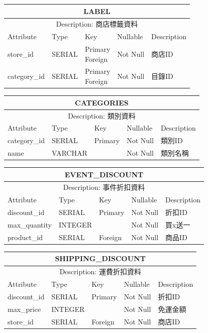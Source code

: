 \documentclass[a4paper, 12pt]{article}
\begin{document}
\noindent\begin{tabular}{ | p{7em} | p{5.5em} | p{5.5em} | p{4.5em} | p{11em} |}
  \hline
  \multicolumn{5}{|c|}{LABEL} \tabularnewline
  \hline 
  \multicolumn{5}{|c|}{Description: 商店標籤資料} \tabularnewline
  \hline 
  Attribute & Type & Key & Nullable & Description \\
  \hline
  store_id& SERIAL & \makecell[l]{Primary \\ Foreign}& Not Null & 商店ID \\
  \hline
  category_id & SERIAL & \makecell[l]{Primary \\ Foreign} &Not Null &目錄ID\\
  \hline
\end{tabular}
\vspace{1em}

\noindent\begin{tabular}{ | p{7em} | p{5.5em} | p{5.5em} | p{4.5em} | p{11em} |}
  \hline
  \multicolumn{5}{|c|}{CATEGORIES} \tabularnewline
  \hline 
  \multicolumn{5}{|c|}{Description: 類別資料} \tabularnewline
  \hline 
  Attribute & Type & Key & Nullable & Description \\
  \hline
  category_id& SERIAL & Primary & Not Null & 類別ID \\
  \hline
  name & VARCHAR & &Not Null &類別名稱\\
  \hline
\end{tabular}

\vspace{1em}
\noindent\begin{tabular}{ | p{7em} | p{5.5em} | p{5.5em} | p{4.5em} | p{11em} |}
  \hline
  \multicolumn{5}{|c|}{EVENT_DISCOUNT} \tabularnewline
  \hline 
  \multicolumn{5}{|c|}{Description: 事件折扣資料} \tabularnewline
  \hline 
  Attribute & Type & Key & Nullable & Description \\
  \hline
  discount_id & SERIAL & Primary & Not Null & 折扣ID \\
  \hline
  max_quantity & INTEGER & &Not Null &買x送一\\
  \hline
  product_id & SERIAL & Foreign &Not Null &商品ID\\
  \hline
\end{tabular}
\vspace{1em}

\noindent\begin{tabular}{ | p{7em} | p{5.5em} | p{5.5em} | p{4.5em} | p{11em} |}
  \hline
  \multicolumn{5}{|c|}{SHIPPING_DISCOUNT} \tabularnewline
  \hline 
  \multicolumn{5}{|c|}{Description: 運費折扣資料} \tabularnewline
  \hline 
  Attribute & Type & Key & Nullable & Description \\
  \hline
  discount_id & SERIAL & Primary & Not Null & 折扣ID \\
  \hline
  max_price & INTEGER & &Not Null &免運金額\\
  \hline
  store_id & SERIAL & Foreign &Not Null &商店ID\\
  \hline
\end{tabular}
\vspace{1em}
\end{document}
